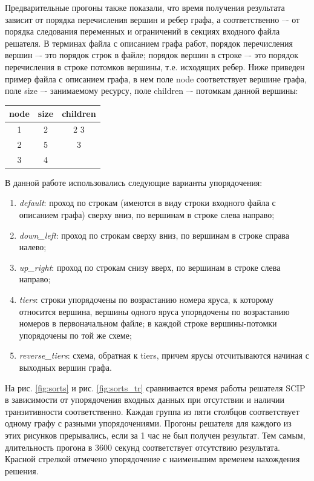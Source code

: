 Предварительные прогоны также показали, что время получения результата зависит от порядка перечисления вершин и ребер графа, а соответственно –- от порядка следования переменных и ограничений в секциях входного файла
решателя. В терминах файла с описанием графа работ, порядок перечисления
вершин –- это порядок строк в файле; порядок вершин в строке –- это порядок
перечисления в строке потомков вершины, т.е. исходящих ребер. Ниже приведен
пример файла с описанием графа, в нем поле node соответствует вершине
графа, поле size –- занимаемому ресурсу, поле children –- потомкам данной
вершины:
\begin{table}[h]
    \centering
    \begin{tabular}{ccc}
        node & size & children \\
        \hline
        1 & 2 & 2 3 \\
        2 & 5 & 3 \\
        3 & 4 &   \\
    \end{tabular}
    \label{tab:sample_data}
\end{table}

В данной работе использовались следующие варианты упорядочения: 

\begin{enumerate}
    \item \textit{default}: проход по строкам (имеются в виду строки входного файла с описанием графа) сверху вниз, по вершинам в строке слева
направо;

    \item \textit{down\_left}: проход по строкам сверху вниз, по вершинам в строке справа
налево;

    \item \textit{up\_right}: проход по строкам снизу вверх, по вершинам в строке слева
направо;

    \item \textit{tiers}: строки упорядочены по возрастанию номера яруса, к которому
относится вершина, вершины одного яруса упорядочены по
возрастанию номеров в первоначальном файле; в каждой строке вершины-потомки упорядочены
по той же схеме;

    \item \textit{reverse\_tiers}: схема, обратная к tiers, причем ярусы отсчитываются
начиная с выходных вершин графа.
\end{enumerate}

На рис. \ref{fig:sorts} и рис. \ref{fig:sorts_tr} сравнивается время работы решателя SCIP в зависимости от упорядочения входных данных при отсутствии и наличии транзитивности соответственно. Каждая группа из пяти столбцов соответствует одному графу с разными упорядочениями. Прогоны решателя для каждого из этих рисунков прерывались, если за 1 час не был получен результат. Тем самым, длительность прогона в 3600 секунд соответствует отсутствию результата. Красной стрелкой отмечено упорядочение с наименьшим временем нахождения решения.

